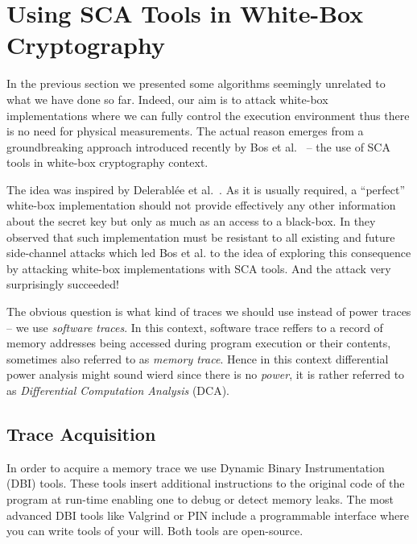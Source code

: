 \section{Using SCA Tools in White-Box Cryptography}
\label{sec:scawbc}

In the previous section we presented some algorithms seemingly unrelated to what we have done so far. Indeed, our aim is to attack white-box implementations where we can fully control the execution environment thus there is no need for physical measurements. The actual reason emerges from a groundbreaking approach introduced recently by Bos et al.\ \cite{bos2015differential} -- the use of SCA tools in white-box cryptography context.

The idea was inspired by Delerabl{\'e}e et al.\ \cite{delerablee2013white}. As it is usually required, a ``perfect'' white-box implementation should not provide effectively any other information about the secret key but only as much as an access to a black-box. In \cite{delerablee2013white} they observed that such implementation must be resistant to all existing and future side-channel attacks which led Bos et al. to the idea of exploring this consequence by attacking white-box implementations with SCA tools. And the attack very surprisingly succeeded!

The obvious question is what kind of traces we should use instead of power traces -- we use {\em software traces}. In this context, software trace reffers to a record of memory addresses being accessed during program execution or their contents, sometimes also referred to as {\em memory trace}. Hence in this context differential power analysis might sound wierd since there is no {\em power}, it is rather referred to as {\em Differential Computation Analysis} (DCA).



\subsection{Trace Acquisition}
\label{sec:tracq}

In order to acquire a memory trace we use Dynamic Binary Instrumentation (DBI) tools. These tools insert additional instructions to the original code of the program at run-time enabling one to debug or detect memory leaks. The most advanced DBI tools like Valgrind \cite{nethercote2007valgrind} or PIN \cite{luk2005pin} include a programmable interface where you can write tools of your will. Both tools are open-source.

